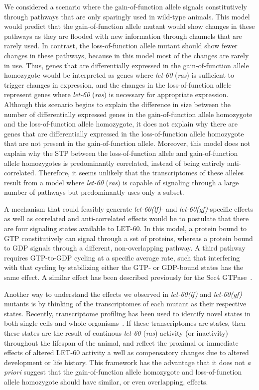\documentclass[10pt, onecolumn]{article}
\newcommand{\gf}{gain-of-function allele}
\newcommand{\lf}{loss-of-function allele}
\newcommand{\gene}[1]{\mbox{\emph{#1}}}
\newcommand{\protein}[1]{\mbox{\uppercase{#1}}}
\newcommand{\ras}{\gene{let-60} (\emph{ras})}
\newcommand{\rasp}{\protein{let-60}}
\newcommand{\letgf}{\gene{let-60(gf)}}
\newcommand{\letlf}{\gene{let-60(lf)}}
\begin{document}
We considered a scenario where the \gf{} signals constitutively through pathways
that are only sparingly used in wild-type animals. This model would predict that
the \gf{} mutant would show changes in these pathways as they are flooded with
new information through channels that are rarely used. In contrast, the \lf{}
mutant should show fewer changes in these pathways, because in this model most
of the changes are rarely in use. Thus, genes that are differentially expressed
in the \gf{} homozygote would be interpreted as genes where \ras{} is sufficient
to trigger changes in expression, and the changes in the \lf{} represent genes
where \ras{} is necessary for appropriate expression. Although this scenario
begins to explain the difference in size between the number of differentially
expressed genes in the \gf{} homozygote and the \lf{} homozygote, it does not
explain why there are genes that are differentially expressed in the \lf{}
homozygote that are not present in the \gf{}. Moreover, this model does not
explain why the STP between the \lf{} and \gf{} homozygotes is predominantly
correlated, instead of being entirely anti-correlated. Therefore, it seems
unlikely that the transcriptomes of these alleles result from a model where
\ras{} is capable of signaling through a large number of pathways but
predominantly uses only a subset.

A mechanism that could feasibly generate \letlf{}- and \letgf{}-specific effects
as well as correlated and anti-correlated effects would be to postulate that
there are four signaling states available to \rasp{}. In this model, a protein
bound to GTP constitutively can signal through a set of proteins, whereas a
protein bound to GDP signals through a different, non-overlapping pathway. A
third pathway requires GTP-to-GDP cycling at a specific average rate, such that
interfering with that cycling by stabilizing either the GTP- or GDP-bound states
has the same effect. A similar effect has been described previously for the Sec4
GTPase~\cite{}.

Another way to understand the effects we observed in \letlf{} and \letgf{}
mutants is by thinking of the transcriptomes of each mutant as their respective
states. Recently, transcriptome profiling has been used to identify novel states
in both single cells and whole-organisms~\cite{Villani2017}. If these transcriptomes are states, then these states are the
result of continous \ras{} activity (or inactivity) throughout the lifespan of
the animal, and reflect the proximal or immediate effects of altered \rasp{}
activity a well as compensatory changes due to altered development or life
history. This framework has the advantage that it does not \emph{a priori}
suggest that the \gf{} homozygote and \lf{} homozygote should have similar, or
even overlapping, effects.
\end{document}
